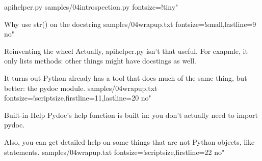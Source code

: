 \documentclass{pyslides}
\begin{document}
\begin{frame}[fragile]{apihelper.py}
 samples/04introspection.py fontsize=!tiny"
\end{frame}

\begin{frame}[fragile]{Why use str() on the docstring}
 samples/04wrapup.txt fontsize=!small,lastline=9 no"
\end{frame}

\begin{frame}[fragile]{Reinventing the wheel}
Actually, apihelper.py isn't that useful. For exapmle, it only lists methods:
other things might have docstings as well.

It turns out Python already has a tool that
does much of the same thing, but better: the pydoc module.
\bigskip
 samples/04wrapup.txt fontsize=!scriptsize,firstline=11,lastline=20 no"
\end{frame}

\begin{frame}[fragile]{Built-in Help}
Pydoc's help function is built in: you don't actually need to import pydoc.

Also, you can get detailed help on some things that are not Python objects, like statements.
\bigskip
 samples/04wrapup.txt fontsize=!scriptsize,firstline=22 no"
\end{frame}
\end{document}
